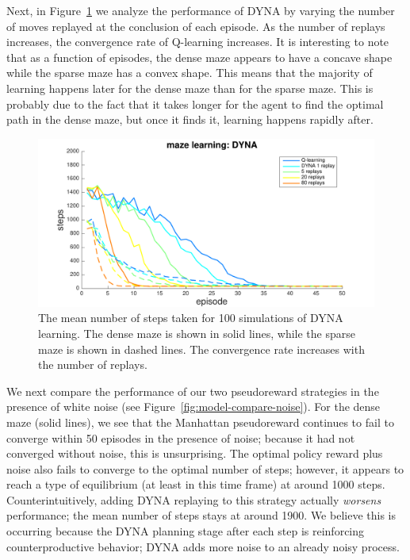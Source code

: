 \documentclass[notitlepage]{article}
\begin{document}
Next, in Figure~\ref{fig:dyna-compare} we analyze the performance of DYNA by varying the number of moves replayed at the conclusion of each episode. As the number of replays increases, the convergence rate of Q-learning increases. It is interesting to note that as a function of episodes, the dense maze appears to have a concave shape while the sparse maze has a convex shape. This means that the majority of learning happens later for the dense maze than for the sparse maze. This is probably due to the fact that it takes longer for the agent to find the optimal path in the dense maze, but once it finds it, learning happens rapidly after. 

\begin{figure}[ht]
\includegraphics[width=\textwidth]{DYNAcompare}
\caption{The mean number of steps taken for 100 simulations of DYNA learning. The dense maze is shown in solid lines, while the sparse maze is shown in dashed lines. The convergence rate increases with the number of replays.}
\label{fig:dyna-compare}
\end{figure}

We next compare the performance of our two pseudoreward strategies in the presence of white noise (see Figure~\ref{fig:model-compare-noise}). For the dense maze (solid lines), we see that the Manhattan pseudoreward continues to fail to converge within 50 episodes in the presence of noise; because it had not converged without noise, this is unsurprising. The optimal policy reward plus noise also fails to converge to the optimal number of steps; however, it appears to reach a type of equilibrium (at least in this time frame) at around 1000 steps. Counterintuitively, adding DYNA replaying to this strategy actually \textit{worsens} performance; the mean number of steps stays at around 1900. We believe this is occurring because the DYNA planning stage after each step is reinforcing counterproductive behavior; DYNA adds more noise to an already noisy process.
\end{document}
